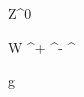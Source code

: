 
\newmathsymbol{\Zboson}      {Z^0}

\newmathsymbol{\Wboson}      {W}
\newmathsymbol{\Wp}          {\Wboson^+}
\newmathsymbol{\Wm}          {\Wboson^-}
\newmathsymbol{\Wpm}         {\Wboson^\pm}

\newmathsymbol{\photon}      {\gamma}

\newmathsymbol{\gluon}       {g}